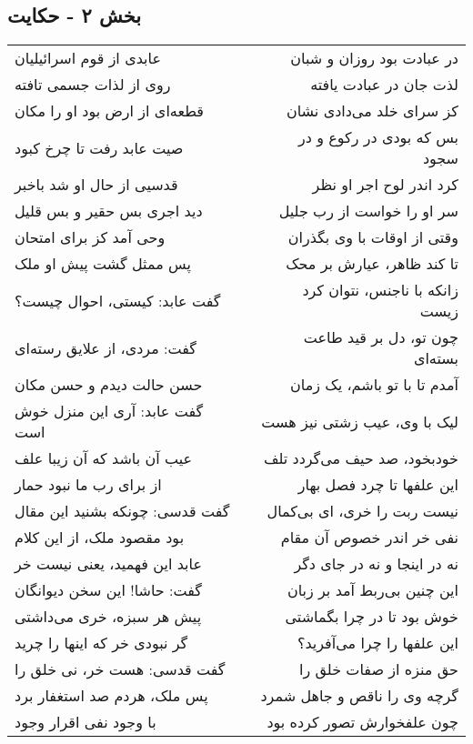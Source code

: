 \begin{center}
\section*{بخش ۲ - حکایت}
\label{sec:002}
\begin{longtable}{l p{0.5cm} r}
عابدی از قوم اسرائیلیان
&&
در عبادت بود روزان و شبان
\\
روی از لذات جسمی تافته
&&
لذت جان در عبادت یافته
\\
قطعه‌ای از ارض بود او را مکان
&&
کز سرای خلد می‌دادی نشان
\\
صیت عابد رفت تا چرخ کبود
&&
بس که بودی در رکوع و در سجود
\\
قدسیی از حال او شد باخبر
&&
کرد اندر لوح اجر او نظر
\\
دید اجری بس حقیر و بس قلیل
&&
سر او را خواست از رب جلیل
\\
وحی آمد کز برای امتحان
&&
وقتی از اوقات با وی بگذران
\\
پس ممثل گشت پیش او ملک
&&
تا کند ظاهر، عیارش بر محک
\\
گفت عابد: کیستی، احوال چیست؟
&&
زانکه با ناجنس، نتوان کرد زیست
\\
گفت: مردی، از علایق رسته‌ای
&&
چون تو، دل بر قید طاعت بسته‌ای
\\
حسن حالت دیدم و حسن مکان
&&
آمدم تا با تو باشم، یک زمان
\\
گفت عابد: آری این منزل خوش است
&&
لیک با وی، عیب زشتی نیز هست
\\
عیب آن باشد که آن زیبا علف
&&
خودبخود، صد حیف می‌گردد تلف
\\
از برای رب ما نبود حمار
&&
این علفها تا چرد فصل بهار
\\
گفت قدسی: چونکه بشنید این مقال
&&
نیست ربت را خری، ای بی‌کمال
\\
بود مقصود ملک، از این کلام
&&
نفی خر اندر خصوص آن مقام
\\
عابد این فهمید، یعنی نیست خر
&&
نه در اینجا و نه در جای دگر
\\
گفت: حاشا! این سخن دیوانگان
&&
این چنین بی‌ربط آمد بر زبان
\\
پیش هر سبزه، خری می‌داشتی
&&
خوش بود تا در چرا بگماشتی
\\
گر نبودی خر که اینها را چرید
&&
این علفها را چرا می‌آفرید؟
\\
گفت قدسی: هست خر، نی خلق را
&&
حق منزه از صفات خلق را
\\
پس ملک، هردم صد استغفار برد
&&
گرچه وی را ناقص و جاهل شمرد
\\
با وجود نفی اقرار وجود
&&
چون علفخوارش تصور کرده بود

\end{longtable}
\end{center}

